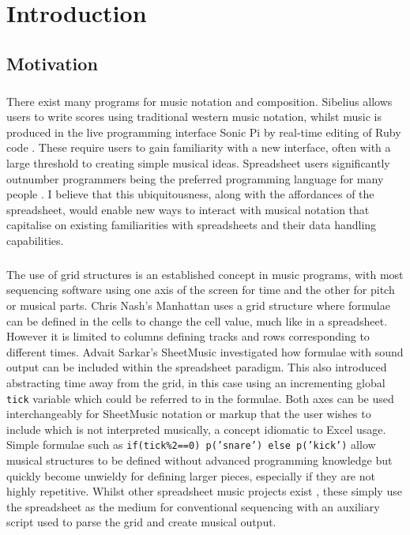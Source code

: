 
\chapter{Introduction}

\section{Motivation}

\paragraph{} There exist many programs for music notation and composition. Sibelius allows users to write scores using traditional western music notation, whilst music is produced in the live programming interface Sonic Pi by real-time editing of Ruby code \cite{aaron:pi}. These require users to gain familiarity with a new interface, often with a large threshold to creating simple musical ideas. Spreadsheet users significantly outnumber programmers \cite{scaffidi:estimating} being the preferred programming language for many people \cite{blackwell:functions}. I believe that this ubiquitousness, along with the affordances of the spreadsheet, would enable new ways to interact with musical notation that capitalise on existing familiarities with spreadsheets and their data handling capabilities.

\paragraph{} The use of grid structures is an established concept in music programs, with most sequencing software using one axis of the screen for time and the other for pitch or musical parts. Chris Nash's Manhattan \cite{nash:manhattan} uses a grid structure where formulae can be defined in the cells to change the cell value, much like in a spreadsheet. However it is limited to columns defining tracks and rows corresponding to different times. Advait Sarkar's SheetMusic \cite{sarkar:sheetmusic} investigated how formulae with sound output can be included within the spreadsheet paradigm. This also introduced abstracting time away from the grid, in this case using an incrementing global \texttt{tick} variable which could be referred to in the formulae. Both axes can be used interchangeably for SheetMusic notation or markup that the user wishes to include which is not interpreted musically, a concept idiomatic to Excel usage. Simple formulae such as \texttt{if(tick\%2==0) p('snare') else p('kick')} allow musical structures to be defined without advanced programming knowledge but quickly become unwieldy for defining larger pieces, especially if they are not highly repetitive. Whilst other spreadsheet music projects exist \cite{hackaday:spreadsheet}, these simply use the spreadsheet as the medium for conventional sequencing with an auxiliary script used to parse the grid and create musical output.

